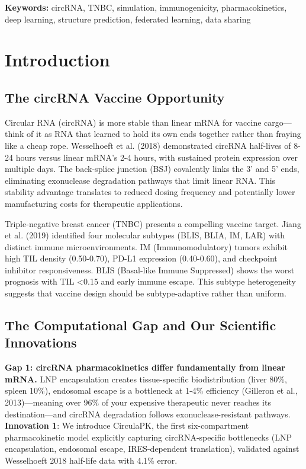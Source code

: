 \documentclass[12pt]{article}
\begin{document}
\textbf{Keywords:} circRNA, TNBC, simulation, immunogenicity, pharmacokinetics, deep learning, structure prediction, federated learning, data sharing

\section{Introduction}

\subsection{The circRNA Vaccine Opportunity}

Circular RNA (circRNA) is more stable than linear mRNA for vaccine cargo—think of it as RNA that learned to hold its own ends together rather than fraying like a cheap rope. Wesselhoeft et al. (2018) demonstrated circRNA half-lives of 8-24 hours versus linear mRNA's 2-4 hours, with sustained protein expression over multiple days. The back-splice junction (BSJ) covalently links the 3' and 5' ends, eliminating exonuclease degradation pathways that limit linear RNA. This stability advantage translates to reduced dosing frequency and potentially lower manufacturing costs for therapeutic applications.

Triple-negative breast cancer (TNBC) presents a compelling vaccine target. Jiang et al. (2019) identified four molecular subtypes (BLIS, BLIA, IM, LAR) with distinct immune microenvironments. IM (Immunomodulatory) tumors exhibit high TIL density (0.50-0.70), PD-L1 expression (0.40-0.60), and checkpoint inhibitor responsiveness. BLIS (Basal-like Immune Suppressed) shows the worst prognosis with TIL <0.15 and early immune escape. This subtype heterogeneity suggests that vaccine design should be subtype-adaptive rather than uniform.

\subsection{The Computational Gap and Our Scientific Innovations}

\textbf{Gap 1: circRNA pharmacokinetics differ fundamentally from linear mRNA.} LNP encapsulation creates tissue-specific biodistribution (liver 80\%, spleen 10\%), endosomal escape is a bottleneck at 1-4\% efficiency (Gilleron et al., 2013)—meaning over 96\% of your expensive therapeutic never reaches its destination—and circRNA degradation follows exonuclease-resistant pathways. \textbf{Innovation 1}: We introduce CirculaPK, the first six-compartment pharmacokinetic model explicitly capturing circRNA-specific bottlenecks (LNP encapsulation, endosomal escape, IRES-dependent translation), validated against Wesselhoeft 2018 half-life data with 4.1\% error.
\end{document}
